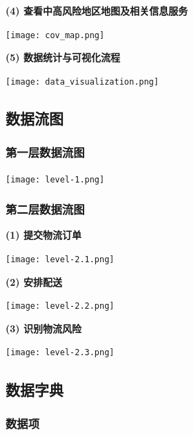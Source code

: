 \documentclass[12pt]{article}
\begin{document}
\noindent \textbf{(4) 查看中高风险地区地图及相关信息服务}
\begin{center}
	\texttt{[image: cov\_map.png]}
\end{center}

\noindent \textbf{(5) 数据统计与可视化流程}
\begin{center}
	\texttt{[image: data\_visualization.png]}
\end{center}

\newpage
\subsection{数据流图}

\subsubsection{第一层数据流图}

\begin{center}
	\texttt{[image: level-1.png]}
\end{center}

\subsubsection{第二层数据流图}

\noindent \textbf{(1) 提交物流订单}
\begin{center}
	\texttt{[image: level-2.1.png]}
\end{center}

\noindent \textbf{(2) 安排配送}
\begin{center}
	\texttt{[image: level-2.2.png]}
\end{center}

\noindent \textbf{(3) 识别物流风险}
\begin{center}
	\texttt{[image: level-2.3.png]}
\end{center}

\subsection{数据字典}

\subsubsection{数据项}

\tabletail{\bottomrule}
\end{document}
